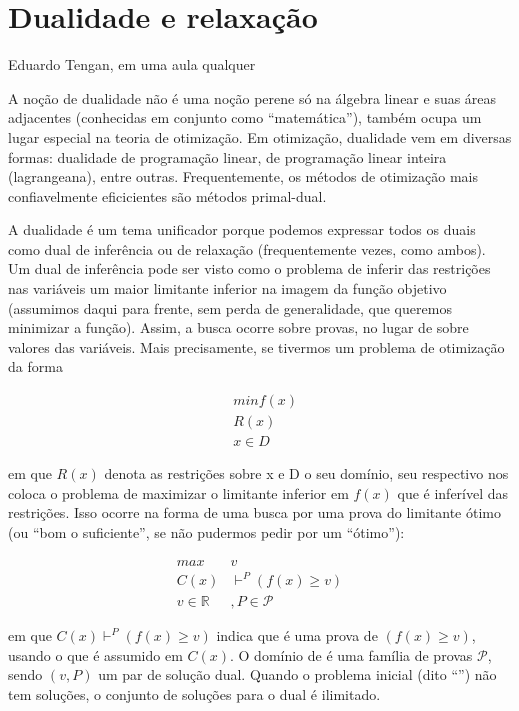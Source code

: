 \documentclass{article}
\begin{document}
\section{Dualidade e relaxação}

\epigraph{}{Eduardo Tengan, em uma aula qualquer}

A noção de dualidade não é uma noção perene só na álgebra linear e suas áreas adjacentes (conhecidas
em conjunto como ``matemática''), também ocupa um lugar especial na teoria de otimização. Em
otimização, dualidade vem em diversas formas: dualidade de programação linear, de programação
linear inteira (lagrangeana), entre outras. Frequentemente, os métodos de otimização mais
confiavelmente eficicientes são métodos primal-dual.

A dualidade é um tema unificador porque podemos expressar todos os duais como dual de inferência ou
de relaxação (frequentemente vezes, como ambos). Um dual de inferência pode ser visto como o
problema de inferir das restrições nas variáveis um maior limitante inferior na imagem da função
objetivo (assumimos daqui para frente, sem perda de generalidade, que queremos minimizar a função). Assim, a busca ocorre
sobre provas, no lugar de sobre valores das variáveis. Mais precisamente, se tivermos um problema de
otimização da forma

\begin{align}
  &  min f(x)\\
  &  R(x)\\
  &  x \in D
\end{align}

\noindent em que $R(x)$ denota as restrições sobre x e D o seu domínio, seu respectivo
 nos coloca o problema de maximizar o limitante inferior em $f(x)$ que
é inferível das restrições. Isso ocorre na forma de uma busca por uma prova do limitante ótimo (ou
``bom o suficiente'', se não pudermos pedir por um ``ótimo''):

\begin{align}
  max \; & v\\
  C(x) & \vdash^{P} (f(x) \geq v)\\
  v \in \mathbb{R}&, P \in \mathcal{P}
\end{align}

\noindent em que $C(x) \vdash^{P} (f(x) \geq v)$ indica que  é uma prova de $(f(x) \geq v)$,
usando o que é assumido em $C(x)$. O domínio de  é uma família de provas $\mathcal{P}$, sendo
$(v,P)$ um par de solução dual. Quando o problema inicial (dito ``'') não tem
soluções, o conjunto de soluções para o dual é ilimitado.
\end{document}
